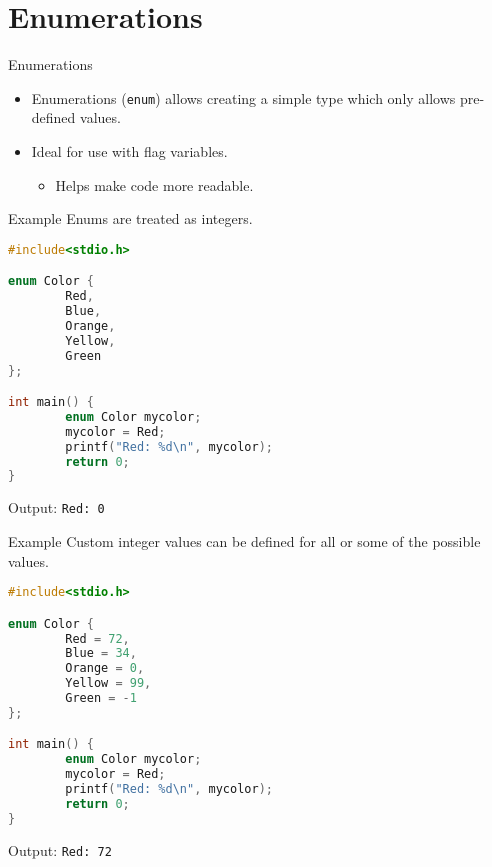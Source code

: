\documentclass[graphics]{beamer}
\begin{document}
\section{Enumerations}
\begin{frame}{Enumerations}
    \begin{itemize}
        \item Enumerations (\texttt{enum}) allows creating a simple type which only allows pre-defined values.
        \item Ideal for use with flag variables.
        \begin{itemize}
            \item Helps make code more readable.
        \end{itemize}
    \end{itemize}
\end{frame}

\begin{frame}[fragile]{Example}
    Enums are treated as integers.
    \begin{lstlisting}[language=C,basicstyle=\footnotesize,keywordstyle=\color{blue},commentstyle=\color{green},showstringspaces=false,stringstyle=\color{red}]
#include<stdio.h>

enum Color {
        Red,
        Blue,
        Orange,
        Yellow,
        Green
};

int main() {
        enum Color mycolor;
        mycolor = Red;
        printf("Red: %d\n", mycolor);
        return 0;
}
    \end{lstlisting}
    Output: \texttt{Red: 0}
\end{frame}

\begin{frame}[fragile]{Example}
    Custom integer values can be defined for all or some of the possible values.
    \begin{lstlisting}[language=C,basicstyle=\footnotesize,keywordstyle=\color{blue},commentstyle=\color{green},showstringspaces=false,stringstyle=\color{red}]
#include<stdio.h>

enum Color {
        Red = 72,
        Blue = 34,
        Orange = 0,
        Yellow = 99,
        Green = -1
};

int main() {
        enum Color mycolor;
        mycolor = Red;
        printf("Red: %d\n", mycolor);
        return 0;
}
    \end{lstlisting}
    Output: \texttt{Red: 72}
\end{frame}
\end{document}
